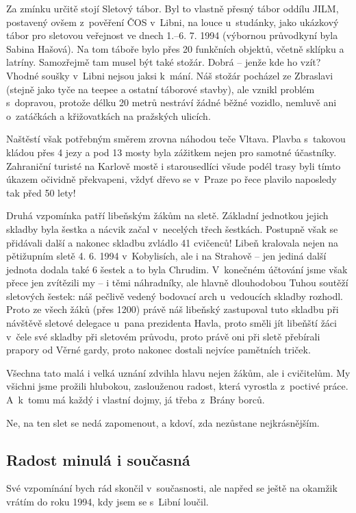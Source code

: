 \documentclass[a5paper, 11pt, twoside]{article}
\begin{document}
Za zmínku určitě stojí Sletový tábor. Byl to vlastně přesný tábor oddílu
JILM, postavený ovšem z~pověření ČOS v~Libni, na louce u~studánky, jako
ukázkový tábor pro sletovou veřejnost ve dnech 1.--6. 7. 1994 (výbornou
průvodkyní byla Sabina Hašová). Na tom táboře bylo přes 20 funkčních
objektů, včetně sklípku a latríny. Samozřejmě tam musel být také stožár.
Dobrá -- jenže kde ho vzít? Vhodné soušky v~Libni nejsou jaksi k~mání.
Náš stožár pocházel ze Zbraslavi (stejně jako tyče na teepee a ostatní
táborové stavby), ale vznikl problém s~dopravou, protože délku 20 metrů
nestráví žádné běžné vozidlo, nemluvě ani o~zatáčkách a křižovatkách na
pražských ulicích.

Naštěstí však potřebným směrem zrovna náhodou teče Vltava. Plavba
s~takovou kládou přes 4 jezy a pod 13 mosty byla zážitkem nejen pro
samotné účastníky. Zahraniční turisté na Karlově mostě i starousedlíci
všude podél trasy byli tímto úkazem očividně překvapeni, vždyť dřevo se
v~Praze po řece plavilo naposledy tak před 50 lety!

Druhá vzpomínka patří libeňským žákům na sletě. Základní jednotkou
jejich skladby byla šestka a nácvik začal v~necelých třech šestkách.
Postupně však se přidávali další a nakonec skladbu zvládlo 41 cvičenců!
Libeň kralovala nejen na pětižupním sletě 4. 6. 1994 v~Kobylisích, ale i
na Strahově -- jen jediná další jednota dodala také 6 šestek a to byla
Chrudim. V~konečném účtování jsme však přece jen zvítězili my -- i těmi
náhradníky, ale hlavně dlouhodobou Tuhou soutěží sletových šestek: náš
pečlivě vedený bodovací arch u~vedoucích skladby rozhodl. Proto ze všech
žáků (přes 1200) právě náš libeňský zastupoval tuto skladbu při návštěvě
sletové delegace u~pana prezidenta Havla, proto směli jít libeňští žáci
v~čele své skladby při sletovém průvodu, proto právě oni při sletě
přebírali prapory od Věrné gardy, proto nakonec dostali nejvíce
pamětních triček.

Všechna tato malá i velká uznání zdvihla hlavu nejen žákům, ale i
cvičitelům. My všichni jsme prožili hlubokou, zaslouženou radost, která
vyrostla z~poctivé práce. A~k~tomu má každý i vlastní dojmy, já třeba
z~Brány borců.

Ne, na ten slet se nedá zapomenout, a kdoví, zda nezůstane
nejkrásnějším.

\subsection{Radost minulá i
současná}

Své vzpomínání bych rád skončil v~současnosti, ale napřed se ještě na
okamžik vrátím do roku 1994, kdy jsem se s~Libní loučil.
\end{document}
